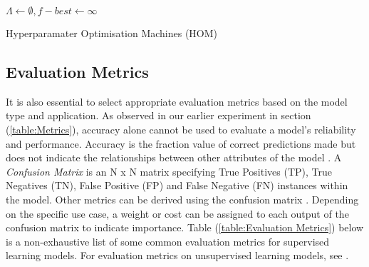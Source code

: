 \begin{algorithm}[H]
    \SetAlgoLined
    $\Lambda \leftarrow \emptyset, f-{best} \leftarrow \infty$\\

    
    \caption{Hyperparamater Optimisation Machines (HOM) }%
\end{algorithm}

\subsection{Evaluation Metrics}
It is also essential to select appropriate evaluation metrics based on the model type and application.
As observed in our earlier experiment in section (\ref{table:Metrics}), accuracy alone cannot be used to evaluate a model's reliability and performance.
Accuracy is the fraction value of correct predictions made but does not indicate the relationships between other attributes of the model \cite{8320256}.
A \textit{Confusion Matrix} is an N x N matrix specifying True Positives (TP), True Negatives (TN), False Positive (FP) and False Negative (FN) instances within the model.
Other metrics can be derived using the confusion matrix \cite{8320256}.
Depending on the specific use case, a weight or cost can be assigned to each output of the confusion matrix to indicate importance.
Table (\ref{table:Evaluation Metrics}) below is a non-exhaustive list of some common evaluation metrics for supervised learning models.
For evaluation metrics on unsupervised learning models, see \cite{palacioniño2019evaluation}.

